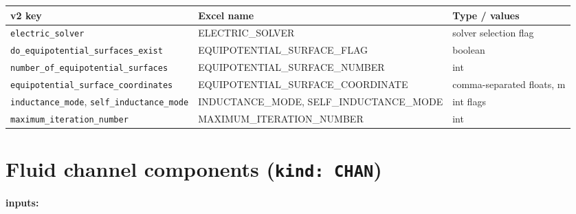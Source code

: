 \documentclass[10pt,a4paper]{article}
\newcommand{\code}[1]{\texttt{#1}}
\begin{document}
\begin{longtable}{p{5.4cm}p{4.6cm}p{5.2cm}}
\toprule
\textbf{v2 key} & \textbf{Excel name} & \textbf{Type / values} \\
\midrule
\endhead
\code{electric\_solver} & ELECTRIC\_SOLVER & solver selection flag \\
\code{do\_equipotential\_surfaces\_exist} & EQUIPOTENTIAL\_SURFACE\_FLAG & boolean \\
\code{number\_of\_equipotential\_surfaces} & EQUIPOTENTIAL\_SURFACE\_NUMBER & int \\
\code{equipotential\_surface\_coordinates} & EQUIPOTENTIAL\_SURFACE\_COORDINATE & comma-separated floats, m \\
\code{inductance\_mode}, \code{self\_inductance\_mode} & INDUCTANCE\_MODE, SELF\_INDUCTANCE\_MODE & int flags \\
\code{maximum\_iteration\_number} & MAXIMUM\_ITERATION\_NUMBER & int \\
\bottomrule
\end{longtable}

\section*{Fluid channel components (\code{kind: CHAN})}

\textbf{inputs:}
\end{document}
